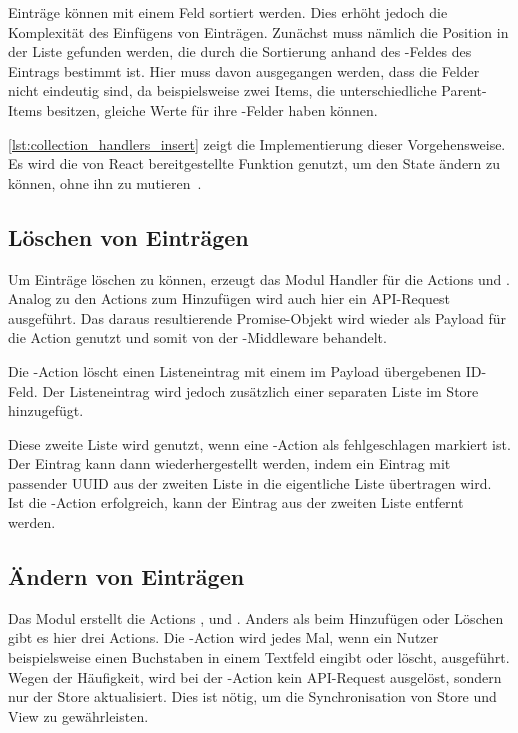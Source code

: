 Einträge können mit einem Feld  sortiert werden.  Dies erhöht jedoch
die Komplexität des Einfügens von Einträgen.  Zunächst muss nämlich die
Position in der Liste gefunden werden, die durch die Sortierung anhand des
-Feldes des Eintrags bestimmt ist.  Hier muss davon ausgegangen
werden, dass die Felder nicht eindeutig sind, da beispielsweise zwei Items, die
unterschiedliche Parent-Items besitzen, gleiche Werte für ihre
-Felder haben können.

\cref{lst:collection_handlers_insert} zeigt die Implementierung dieser
Vorgehensweise.  Es wird die von React bereitgestellte Funktion 
genutzt, um den State ändern zu können, ohne ihn zu mutieren~\cite{update}.



\subsection{Löschen von Einträgen}
\label{ssec:fc_aendern_von_eintraegen}

Um Einträge löschen zu können, erzeugt das Modul Handler für die Actions
 und .
Analog zu den Actions zum Hinzufügen wird auch hier ein API-Request ausgeführt.
Das daraus resultierende Promise-Objekt wird wieder als Payload für die Action
genutzt und somit von der -Middleware behandelt.

Die -Action löscht einen Listeneintrag mit einem im Payload
übergebenen ID-Feld.  Der Listeneintrag wird jedoch zusätzlich einer separaten
Liste im Store hinzugefügt.

Diese zweite Liste wird genutzt, wenn eine -Action als
fehlgeschlagen markiert ist.  Der Eintrag kann dann wiederhergestellt werden,
indem ein Eintrag mit passender UUID aus der zweiten Liste in die eigentliche
Liste übertragen wird.  Ist die -Action erfolgreich, kann der
Eintrag aus der zweiten Liste entfernt werden.

\subsection{Ändern von Einträgen}
\label{ssec:fc_aendern_von_eintraegen}

Das Modul erstellt die Actions ,
 und .
Anders als beim Hinzufügen oder Löschen gibt es hier drei Actions.  Die
-Action wird jedes Mal, wenn ein Nutzer beispielsweise einen
Buchstaben in einem Textfeld eingibt oder löscht, ausgeführt.  Wegen der
Häufigkeit, wird bei der -Action kein API-Request ausgelöst,
sondern nur der Store aktualisiert.  Dies ist nötig, um die Synchronisation von
Store und View zu gewährleisten.

